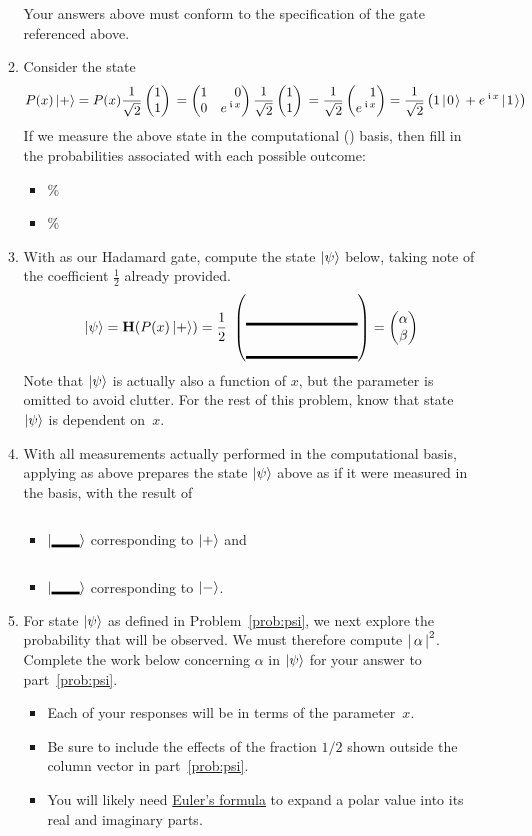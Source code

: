 \documentclass[12pt]{article}
\begin{document}
\begin{enumerate}
\begin{enumerate}[label=\theenumi.\arabic*]
\[  \]
  Your answers above must conform to the specification of the  gate referenced above.
  \item{} Consider the state \[
  P(x)\ket{+} = P(x)\PPlus{}= \SQBG{\relax}{1}{0}{0}{\ExpPhase{x}}\PPlus{} =\RootTwo{}\SQB{1}{\ExpPhase{x}} = \TwoSupOp{1\QZero{}}{\ExpPhase{x}\QOne}{+}
  \]
  If we measure the above state in the computational (\PauliZ{}) basis, then fill in the probabilities associated with each possible outcome:
  \begin{itemize}
      \item \QZero{} \Blank{}\%
      \item \QOne{} \Blank{}\%
  \end{itemize}
  \item\label{prob:psi} With \Hadamard{} as our Hadamard gate, compute the state $\ket{\psi}$ below, taking note of the coefficient $\frac{1}{2}$ already provided.
  \[
  \ket{\psi} = \Hadamard(P(x)\ket{+}) = \frac{1}{2}\ \SQB{\Blank[8em]}{\Blank[8em]} = \SQB{\alpha}{\beta}
  \]
  Note that $\ket{\psi}$ is actually also a function of $x$, but the parameter is omitted to avoid clutter.  For the rest of this problem, know that state~$\ket{\psi}$ is dependent on~$x$.
  \item{} With all measurements actually performed in the computational basis, applying \Hadamard{} as above prepares the state $\ket{\psi}$ above as if it were measured in the \Blank[2em]{} basis, with the result of \begin{itemize}
      \item $\ket{\Blank[2em]}$ corresponding to $\ket{+}$ and 
      \item $\ket{\Blank[2em]}$  corresponding to $\ket{-}$.
   \end{itemize}
  \item{} For state $\ket{\psi}$ as defined in Problem~\ref{prob:psi}, we next explore the probability that \QZero{} will be observed. We must therefore compute ${{|\,\alpha\,|}}^{2}$. Complete the work below concerning $\alpha$ in $\ket{\psi}$ for your answer to part~\ref{prob:psi}.  
  \begin{itemize} 
  \item Each of your responses will be in terms of the parameter~$x$.
  \item Be sure to include the effects of the fraction $1/2$ shown outside the column vector in part~\ref{prob:psi}.
  
  
  \item You will likely need \href{https://en.wikipedia.org/wiki/Euler%27s_formula}{Euler's formula} to expand a polar value into its real and imaginary parts. 
  \end{itemize}
  

\end{enumerate}
\end{enumerate}
\end{document}
